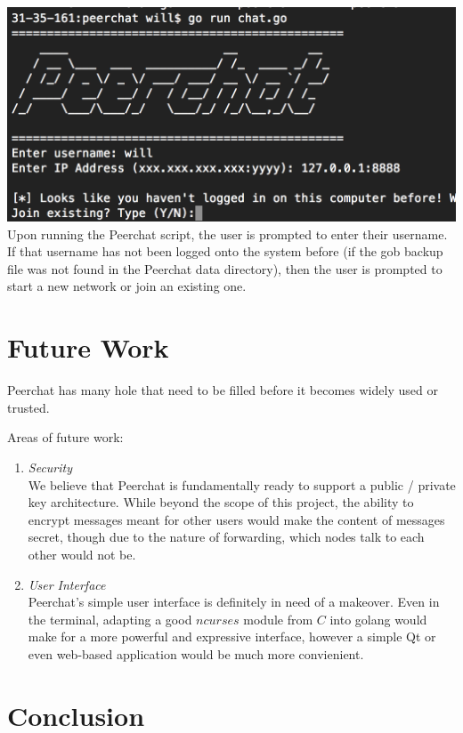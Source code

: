 \documentclass{article}
\begin{document}
\includegraphics[scale=0.8]{ui} \\

Upon running the Peerchat script, the user is prompted to enter their username. If that username has not been logged onto the system before (if the gob backup file was not found in the Peerchat data directory), then the user is prompted to start a new network or join an existing one. 

\section{Future Work}

Peerchat has many hole that need to be filled before it becomes widely used or trusted. 

Areas of future work:
\begin{enumerate}
	\item \textit{Security} \\
	We believe that Peerchat is fundamentally ready to support a public / private key architecture. While beyond the scope of this project, the ability to encrypt messages meant for other users would make the content of messages secret, though due to the nature of forwarding, which nodes talk to each other would not be.  

	\item \textit{User Interface} \\
	Peerchat's simple user interface is definitely in need of a makeover. Even in the terminal, adapting a good $ncurses$ module from $C$ into golang would make for a more powerful and expressive interface, however a simple Qt or even web-based application would be much more convienient. 
	
\end{enumerate}

\section{Conclusion}
\end{document}
